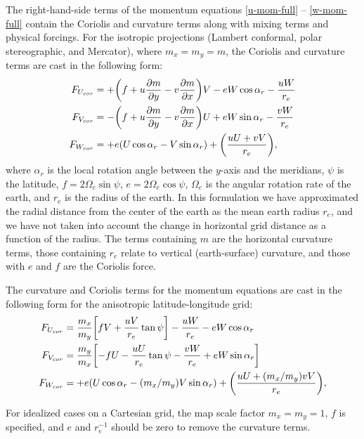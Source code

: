 The right-hand-side terms of the momentum equations
\eqref{u-mom-full} -- \eqref{w-mom-full} contain the Coriolis and 
curvature terms along with mixing terms and 
physical forcings.  For the isotropic projections 
(Lambert conformal, polar stereographic, and Mercator), where
$m_x=m_y=m$, the Coriolis and
curvature terms are cast in the following form:
\begin{align}
F_{U_{cor}} & =  + \biggl(f + u {\partial m \over
\partial y} - v {\partial m \over \partial x}\biggr) V
- e W \cos \alpha_r - {uW \over r_e} 
\label{u-mom-rhs}
\\
%
F_{V_{cor}} & = - \biggl(f + u {\partial m \over
\partial y} - v {\partial m \over \partial x}\biggr) U
+ e W \sin \alpha_r - {v W \over r_e} \\
%
F_{W_{cor}} & = + e (U \cos \alpha_r - V \sin \alpha_r) 
+ \biggl({ uU +vV \over r_e}\biggr),
\label{w-mom-rhs}
\end{align}
\noindent
where $\alpha_r$ is the local rotation angle between the $y$-axis and the
meridians, $\psi$ is the latitude, $f = 2 \Omega_e \sin \psi $, $e = 2
\Omega_e \cos \psi$, $\Omega_e$ is the angular rotation rate of the earth,
and $r_e$ is the radius of the earth.  In this
formulation we have approximated the radial distance from the center of
the earth as the mean earth radius $r_e$, and we have not taken into account
the change in horizontal grid distance as a function of the radius.
The terms containing $m$ are the horizontal curvature terms, those
containing $r_e$ relate to vertical (earth-surface) curvature, and those
with $e$ and $f$ are the Coriolis force.

The curvature and Coriolis terms for the momentum equations
are cast in the following form  
for the anisotropic latitude-longitude grid:
%
\begin{align}
F_{U_{cor}} & =  {m_x \over m_y} \biggl[fV + {uV \over r_e} 
\tan\psi \biggr] - {uW \over r_e} -eW\cos \alpha_r 
\label{u-mom-rhs-global}
\\
%
F_{V_{cor}} & =  {m_y \over m_x} \biggl[ - fU - {uU \over r_e}
\tan \psi  - {vW \over r_e}
+ eW\sin \alpha_r  \biggr] 
\label{v-mom-rhs-global}
\\
%
F_{W_{cor}} & = + e (U \cos \alpha_r - (m_x/m_y) V \sin \alpha_r) 
+ \biggl({ uU + (m_x/m_y) vV \over r_e}\biggr),
\label{w-mom-rhs-global}
%
\end{align}

For idealized cases on a Cartesian grid, the map scale factor $m_x = m_y = 1$, 
$f$ is specified, and $e$ and $r_e^{-1}$ should be zero to remove the curvature terms.

